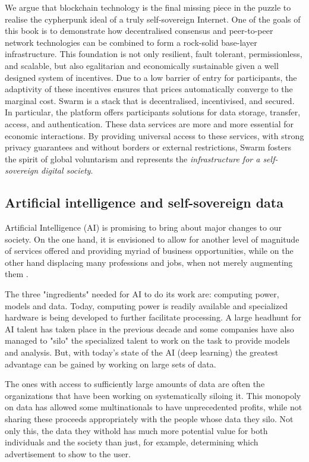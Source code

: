 We argue that blockchain technology is the final missing piece in the puzzle to realise the cypherpunk ideal of a truly self-sovereign Internet. One of the goals of this book is to demonstrate how decentralised consensus and peer-to-peer network technologies can be combined to form a rock-solid base-layer infrastructure. This foundation is not only resilient, fault tolerant, permissionless, and scalable, but also egalitarian and economically sustainable given a well designed system of incentives. Due to a low barrier of entry for participants, the adaptivity of these incentives ensures that prices automatically converge to the marginal cost.
Swarm is a  stack that is decentralised, incentivised, and secured. In particular, the platform offers participants solutions for data storage, transfer, access, and authentication. These data services are more and more essential for economic interactions. By providing universal access to these services, with strong privacy guarantees and without borders or external restrictions, Swarm fosters the spirit of global voluntarism and represents the \emph{infrastructure for a self-sovereign digital society}.

\subsection{Artificial intelligence and self-sovereign data \statusgreen} \label{sec:AIdata}

Artificial Intelligence (AI) is promising to bring about major changes to our society. On the one hand, it is envisioned to allow for another level of magnitude of services offered and providing myriad of business opportunities, while on the other hand displacing many professions and jobs, when not merely augmenting them \cite{Lee2018Sep}.

The three "ingredients" needed for AI to do its work are: computing power, models and data. Today, computing power is readily available and specialized hardware is being developed to further facilitate processing. A large headhunt for AI talent has taken place in the previous decade and some companies have also managed to "silo" the specialized talent to work on the task to provide models and analysis. But, with today's state of the AI (deep learning) the greatest advantage can be gained by working on large sets of data.

The ones with access to sufficiently large amounts of data are often the organizations that have been working on systematically siloing it. This monopoly on data has allowed some multinationals to have unprecedented profits, while not sharing these proceeds appropriately with the people whose data they silo. Not only this, the data they withold has much more potential value for both individuals and the society than just, for example, determining which advertisement to show to the user. 

